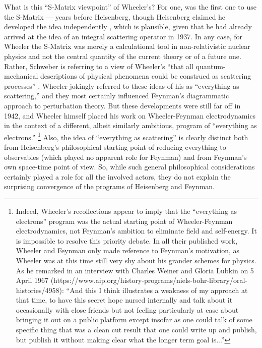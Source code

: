 \documentclass[12pt,a4paper]{article}
\begin{document}
What is this ``S-Matrix viewpoint'' of Wheeler's? For one, \citet{wheeler_1937_on-the-mathematical} was the first one to use the S-Matrix --- years before Heisenberg, though Heisenberg claimed he developed the idea independently \citep{rechenberg_1989_the-early}, which is plausible, given that he had already arrived at the idea of an integral scattering operator in 1937. In any case, for Wheeler the S-Matrix was merely a calculational tool in non-relativistic nuclear physics and not the central quantity of the current theory or of a future one. Rather, Schweber is referring to a view of Wheeler's ``that all quantum-mechanical descriptions of physical phenomena could be construed as scattering processes'' \citep[p. 379]{schweber_1994_qed}. Wheeler jokingly referred to these ideas of his as ``everything as scattering,''  and they most certainly influenced Feynman's diagrammatic approach to perturbation theory. But these developments were still far off in 1942, and Wheeler himself placed his work on Wheeler-Feynman electrodynamics in the context of a different, albeit similarly ambitious, program of ``everything as electrons.'' \citep{wheeler_1989_the-young}\footnote{Indeed, Wheeler's recollections appear to imply that the ``everything as electrons'' program was the actual starting point of Wheeler-Feynman electrodynamics, not Feynman's ambition to eliminate field and self-energy. It is impossible to resolve this priority debate. In all their published work, Wheeler and Feynman only made reference to Feynman's motivation, as Wheeler was at this time still very shy about his grander schemes for physics. As he remarked in an interview with Charles Weiner and Gloria Lubkin on 5 April 1967 (https://www.aip.org/history-programs/niels-bohr-library/oral-histories/4958): ``And this I think illustrates a weakness of my approach at that time, to have this secret hope nursed internally and talk about it occasionally with close friends but not feeling particularly at ease about bringing it out on a public platform except insofar as one could talk of some specific thing that was a clean cut result that one could write up and publish, but publish it without making clear what the longer term goal is...'' } Also, the idea of ``everything as scattering'' is clearly distinct both from Heisenberg's philosophical starting point of reducing everything to observables (which played no apparent role for Feynman) and from Feynman's own space-time point of view. So, while such general philosophical considerations certainly played a role for all the involved actors, they do not explain the surprising convergence of the programs of Heisenberg and Feynman.
\end{document}
